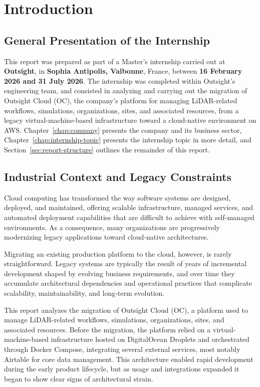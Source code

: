 \chapter{Introduction}
\label{chap:intro}

\section{General Presentation of the Internship}
This report was prepared as part of a Master's internship carried out at \textbf{Outsight}, in \textbf{Sophia Antipolis, Valbonne}, France, between \textbf{16 February 2026 and 31 July 2026}. The internship was completed within Outsight's engineering team, and consisted in analyzing and carrying out the migration of Outsight Cloud (OC), the company's platform for managing LiDAR-related workflows, simulations, organizations, sites, and associated resources, from a legacy virtual-machine-based infrastructure toward a cloud-native environment on AWS. Chapter~\ref{chap:company} presents the company and its business sector, Chapter~\ref{chap:internship-topic} presents the internship topic in more detail, and Section~\ref{sec:report-structure} outlines the remainder of this report.

\section{Industrial Context and Legacy Constraints}
Cloud computing has transformed the way software systems are designed, deployed, and maintained, offering scalable infrastructure, managed services, and automated deployment capabilities that are difficult to achieve with self-managed environments. As a consequence, many organizations are progressively modernizing legacy applications toward cloud-native architectures.

Migrating an existing production platform to the cloud, however, is rarely straightforward. Legacy systems are typically the result of years of incremental development shaped by evolving business requirements, and over time they accumulate architectural dependencies and operational practices that complicate scalability, maintainability, and long-term evolution.

This report analyzes the migration of Outsight Cloud (OC), a platform used to manage LiDAR-related workflows, simulations, organizations, sites, and associated resources. Before the migration, the platform relied on a virtual-machine-based infrastructure hosted on DigitalOcean Droplets and orchestrated through Docker Compose, integrating several external services, most notably Airtable for core data management. This architecture enabled rapid development during the early product lifecycle, but as usage and integrations expanded it began to show clear signs of architectural strain.

